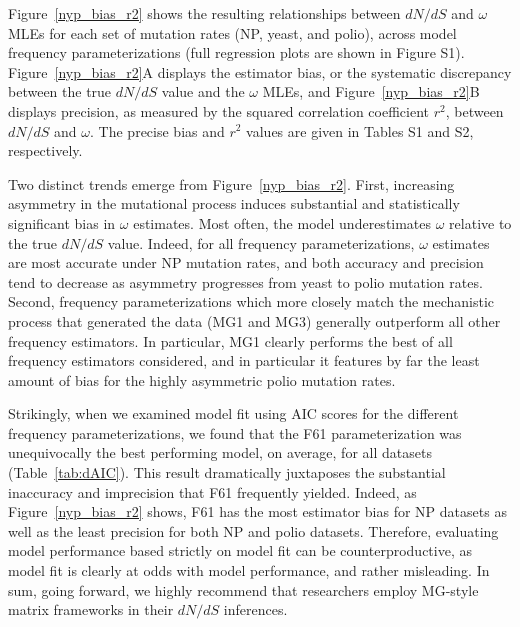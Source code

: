 \documentclass[11pt]{article}
\begin{document}
Figure~\ref{nyp_bias_r2} shows the resulting relationships between $dN/dS$ and $\omega$ MLEs for each set of mutation rates (NP, yeast, and polio), across model frequency parameterizations (full regression plots are shown in Figure S1). Figure~\ref{nyp_bias_r2}A displays the estimator bias, or the systematic discrepancy between the true $dN/dS$ value and the $\omega$ MLEs, and Figure~\ref{nyp_bias_r2}B displays precision, as measured by the squared correlation coefficient $r^2$, between $dN/dS$ and $\omega$. The precise bias and $r^2$ values are given in Tables S1 and S2, respectively.

Two distinct trends emerge from Figure~\ref{nyp_bias_r2}. First, increasing asymmetry in the mutational process induces substantial and statistically significant bias in $\omega$ estimates. Most often, the model underestimates $\omega$ relative to the true $dN/dS$ value.  Indeed, for all frequency parameterizations, $\omega$ estimates are most accurate under NP mutation rates, and both accuracy and precision tend to decrease as asymmetry progresses from yeast to polio mutation rates. Second, frequency parameterizations which more closely match the mechanistic process that generated the data (MG1 and MG3) generally outperform all other frequency estimators. In particular, MG1 clearly performs the best of all frequency estimators considered, and in particular it features by far the least amount of bias for the highly asymmetric polio mutation rates.


Strikingly, when we examined model fit using AIC scores \cite{Akaike1974,BurnhamAnderson2004} for the different frequency parameterizations, we found that the F61 parameterization was unequivocally the best performing model, on average, for all datasets (Table~\ref{tab:dAIC}). This result dramatically juxtaposes the substantial inaccuracy and imprecision that F61 frequently yielded. Indeed, as Figure~\ref{nyp_bias_r2} shows, F61 has the most estimator bias for NP datasets as well as the least precision for both NP and polio datasets. Therefore, evaluating model performance based strictly on model fit can be counterproductive, as model fit is clearly at odds with model performance, and rather misleading. In sum, going forward, we highly recommend that researchers employ MG-style matrix frameworks in their $dN/dS$ inferences.
\end{document}
